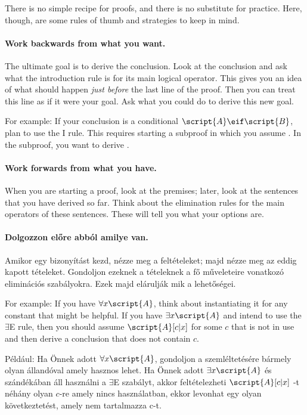 There is no simple recipe for proofs, and there is no substitute for practice. Here, though, are some rules of thumb and strategies to keep in mind.

\paragraph{Work backwards from what you want.}
The ultimate goal is to derive the conclusion. Look at the conclusion and ask what the introduction rule is for its main logical operator. This gives you an idea of what should happen \emph{just before} the last line of the proof. Then you can treat this line as if it were your goal. Ask what you could do to derive this new goal.

For example: If your conclusion is a conditional $\script{A}\eif\script{B}$, plan to use the {\eif}I rule. This requires starting a subproof in which you assume . In the subproof, you want to derive .


\paragraph{Work forwards from what you have.}
When you are starting a proof, look at the premises; later, look at the sentences that you have derived so far. Think about the elimination rules for the main operators of these sentences. These will tell you what your options are.

\paragraph{Dolgozzon előre abból amilye van.}
Amikor egy bizonyítást kezd, nézze meg a feltételeket; majd nézze meg az eddig kapott tételeket. Gondoljon ezeknek a tételeknek a fő műveleteire vonatkozó eliminációs szabályokra. Ezek majd elárulják mik a lehetőségei.

For example: If you have $\forall x\script{A}$, think about instantiating it for any constant that might be helpful. If you have $\exists x\script{A}$ and intend to use the $\exists$E rule, then you should assume $\script{A}[c|x]$ for some $c$ that is not in use and then derive a conclusion that does not contain $c$.

Például: Ha Önnek adott $\forall x\script{A}$, gondoljon a szemléltetésére bármely olyan állandóval amely hasznos lehet. Ha Önnek adott $\exists x\script{A}$ és szándékában áll használni a $\exists$E szabályt, akkor feltételezheti $\script{A}[c|x]$ -t néhány olyan $c$-re amely nincs használatban, ekkor levonhat egy olyan következtetést, amely nem tartalmazza c-t.

